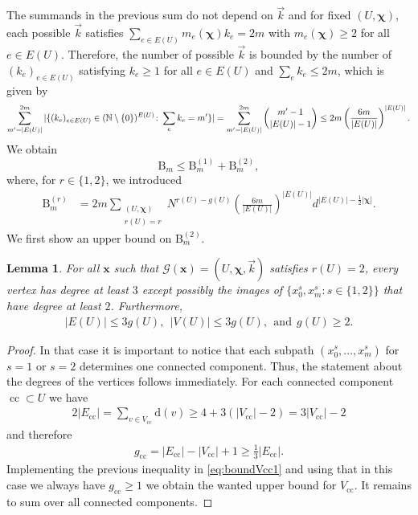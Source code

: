 \documentclass[11pt]{article}
\DeclareMathOperator{\cc}{cc}
\newcommand{\abs}[1]{\left| #1 \right|}
\newcommand{\patx}{\boldsymbol{x}}
\newcommand{\patchi}{\boldsymbol{\chi}}
\theoremstyle{plain}
\newtheorem{lemma}{Lemma}[section]
\theoremstyle{remark}
\numberwithin{equation}{section}
\newcommand{\nc}{\normalcolor}
\begin{document}
	The summands in the previous sum do not depend on $\vec{k}$ and for fixed $(U,\patchi)$, each possible $\vec{k}$ satisfies $\sum_{e\in E(U)} m_{e}(\patchi) k_{e} = 2m$ with $m_e(\patchi) \ge 2$ for all $e \in E(U)$. Therefore, the number of possible $\vec{k}$ is bounded by the number of $(k_{e})_{e \in E(U)}$ satisfying $k_e \ge 1$ for all $e \in E(U)$ and $\sum_{e}k_{e} \le 2m$, which is given by
	\begin{equation*}
	     \sum^{2m}_{m^\prime= \abs{E(U)}} |\{ (k_e)_{e\in E(U)}\in (\mathbb{N}\setminus{\{0\}})^{E(U)} \colon \sum_e k_e =m^\prime\} |=\nc\sum^{2m}_{m^\prime = \abs{E(U)}} \binom{m^\prime-1}{\abs{E(U)}-1} \le 2m \left( \frac{6m}{\abs{E(U)}}\right)^{\abs{E(U)}}.
	\end{equation*}
		We obtain
	\begin{equation*}
	    	      \mathrm{B}_{m} \le \mathrm{B}_{m}^{(1)} + \mathrm{B}_{m}^{(2)}, 
	\end{equation*}
	where, for $r \in \{1, 2\}$, we introduced 
	\begin{align*}
	    	  \mathrm{B}_{m}^{(r)} &= 2m\sum_{\substack{(U,\patchi)\\ r(U)=r}}  N^{r(U)-g(U)} \left(\frac{6m}{|E(U)|}\right)^{|E(U)|}d^{|E(U)| - \frac{1}{2}|\patchi|}.
	\end{align*}
	We first show an upper bound on $\mathrm{B}_{m}^{(2)}$. 
	
	\begin{lemma}\label{lem:bounds_case_ru=r}
	    For all $\patx$ such that $\mathcal G (\patx)= (U,\patchi, \vec{k})$ satisfies $r(U)=2$, every vertex has degree at least $3$ except possibly the images of $\{x_{0}^s,x_m^{s} \colon s\in \{1,2\}\}$ that have degree at least $2$. Furthermore,  
\begin{align*}
    \abs{E(U)} \le 3g(U), ~~ \abs{V(U)} \le 3g(U),~~ \text{and} ~~ g(U)\ge 2.
\end{align*}	

\end{lemma}
\begin{proof}
In that case it is important to notice that each subpath $(x_{0}^s,...,x_{m}^s)$ for $s = 1$ or $s = 2$ determines one connected component. Thus, the statement about the degrees of the vertices follows immediately. 
For each connected component $\cc \subset U$ we have
\begin{align}\label{eq:boundVcc1}
    2|E_{\cc}| = \sum_{v \in V_{\cc}} \mathrm{d}(v) \ge 4 + 3 (|V_{\cc}| -2 ) = 3|V_{\cc}| -2
\end{align}
and therefore
\begin{align*}
    g_{\cc} = \abs{E_{\cc}} - \abs{V_{\cc}} + 1 \ge \frac{1}{3} \abs{E_{\cc}}.
\end{align*}
Implementing the previous inequality in \eqref{eq:boundVcc1} and using that in this case we always have $g_{\cc} \ge 1$ we obtain the wanted upper bound for $V_{\cc}$. It remains to sum over all connected components.
\end{proof}
\end{document}
